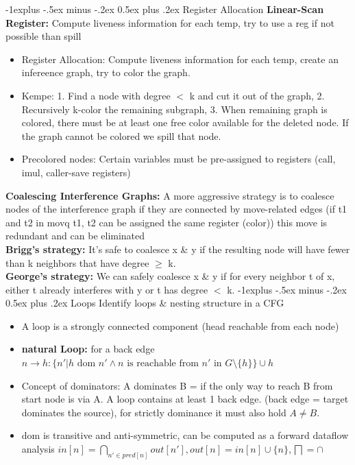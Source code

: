 \documentclass[10pt,landscape]{article}
\makeatletter
\renewcommand{\subsection}{\@startsection{subsection}{2}{0mm}%
                                {-1explus -.5ex minus -.2ex}%
                                {0.5ex plus .2ex}%
                                {\normalfont\normalsize\bfseries}}
\makeatother
\begin{document}
\begin{multicols}{3}
\subsection{Register Allocation}
\textbf{Linear-Scan Register:} Compute liveness information for each temp, try to use a reg if not possible than spill
\begin{itemize}
	\item Register Allocation: Compute liveness information for each temp, create an infereence graph, try to color the graph.
	\item Kempe: 1. Find a node with degree $<$ k and cut it out of the graph, 2. Recursively k-color the remaining subgraph, 3. When remaining graph is colored, there must be at least one free color available for the deleted node. If the graph cannot be colored we spill that node.
	\item Precolored nodes: Certain variables must be pre-assigned to registers (call, imul, caller-save registers)
\end{itemize}
\textbf{Coalescing Interference Graphs:} A more aggressive strategy is to coalesce nodes of the interference
graph if they are connected by move-related edges (if t1 and t2 in movq t1, t2 can be assigned the same register (color)) this move is
redundant and can be eliminated\\
\textbf{Brigg's strategy:} It's safe to coalesce x \& y if the resulting node will have fewer than k neighbors that have degree $\geq$ k. \\
\textbf{George's strategy:} We can safely coalesce x \& y if for every neighbor t of x, either t already interferes with y or t has degree $<$ k.
\subsection{Loops}
Identify loops \& nesting structure in a CFG
\begin{itemize}
	\item A loop is a strongly connected component (head reachable from each node)
	\item \textbf{natural Loop:} for a back edge $n \rightarrow h:\{n' | h \text{ dom } n' \land n \text{ is reachable from }n' \text{ in }G \setminus \{h\}\} \cup h$
	\item Concept of dominators: A dominates B = if the only way to reach B from start node is via A. A loop contains at least 1 back edge. (back edge = target dominates the source), for strictly dominance it must also hold $A \neq B$.
	\item dom is transitive and anti-symmetric, can be computed as a forward dataflow analysis $in[n] = \bigcap_{n' \in pred[n]}out[n'], out[n] = in[n] \cup \{n\}, \bigsqcap = \cap$
\end{itemize}

\end{multicols}
\end{document}

